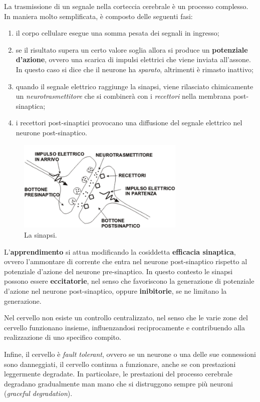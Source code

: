 La trasmissione di un segnale nella corteccia cerebrale è un processo complesso.
In maniera molto semplificata, è composto delle seguenti fasi:
\begin{enumerate}
	\item il corpo cellulare esegue una somma pesata dei segnali in ingresso;
	\item se il risultato supera un certo valore soglia allora si produce un \textbf{potenziale d'azione}, ovvero una scarica di impulsi elettrici che viene inviata all'assone. In questo caso si dice che il neurone ha \emph{sparato}, altrimenti è rimasto inattivo;
	\item quando il segnale elettrico raggiunge la sinapsi, viene rilasciato chimicamente un \emph{neurotrasmettitore} che si combinerà con i \emph{recettori} nella membrana post-sinaptica;
	\item i recettori post-sinaptici provocano una diffusione del segnale elettrico nel neurone post-sinaptico.
\end{enumerate}
\begin{figure}[h!]
	\centering
	\includegraphics[width=8cm]{images/synapse.png}
	\caption{La sinapsi.}\label{fig:synapse}
\end{figure}
L'\textbf{apprendimento} si attua modificando la cosiddetta \textbf{efficacia sinaptica}, ovvero l'ammontare di corrente che entra nel neurone post-sinaptico rispetto al potenziale d'azione del neurone pre-sinaptico. In questo contesto le sinapsi possono essere \textbf{eccitatorie}, nel senso che favoriscono la generazione di potenziale d'azione nel neurone post-sinaptico, oppure \textbf{inibitorie}, se ne limitano la generazione.

Nel cervello non esiste un controllo centralizzato, nel senso che le varie zone del cervello funzionano insieme, influenzandosi reciprocamente e contribuendo alla realizzazione di uno specifico compito.

Infine, il cervello è \emph{fault tolerant}, ovvero se un neurone o una delle sue connessioni sono danneggiati, il cervello continua a funzionare, anche se con prestazioni leggermente degradate. In particolare, le prestazioni del processo cerebrale degradano gradualmente man mano che si distruggono sempre più neuroni (\emph{graceful degradation}).

